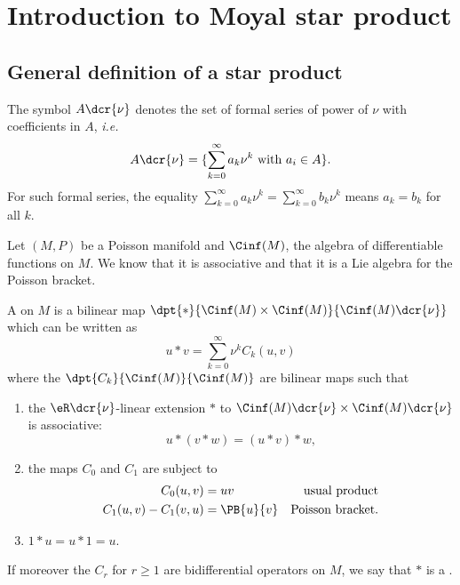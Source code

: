 \section{Introduction to Moyal star product}\label{app:Moyal}

\subsection{General definition of a star product}

The symbol $A\dcr{\nu}$ denotes the set of formal series of power of $\nu$ with coefficients in $A$, \textit{i.e.}
\[
A\dcr{\nu}=\{\sum_{k=0}^{\infty}a_k\nu^k\text{ with } a_i\in A\}.
\]
  For such formal series, the equality $\sum_{k=0}^{\infty}a_k\nu^k=\sum_{k=0}^{\infty}b_k\nu^k$ means $a_k=b_k$ for all $k$.

Let $(M,P)$ be a Poisson manifold and $\Cinf(M)$, the algebra of differentiable functions on $M$. We know that it is associative and that it is a Lie algebra for the Poisson bracket.


\begin{definition}
A  on $M$ is a bilinear map $\dpt{\ast}{\Cinf(M)\times\Cinf(M)}{\Cinf(M)\dcr{\nu}}$ which can be written as
\begin{equation}
       u\ast v=\sum_{k=0}^{\infty}\nu^kC_k(u,v)
\end{equation}
where the $\dpt{C_k}{\Cinf(M)}{\Cinf(M)}$ are bilinear maps such that
\renewcommand{\labelenumi}{(\roman{enumi})}
\begin{enumerate}
\item the $\eR\dcr{\nu}$-linear extension $\ast$ to $\Cinf(M)\dcr{\nu}\times\Cinf(M)\dcr{\nu}$ is associative:
\begin{equation}
                               u\ast(v\ast w)=(u\ast v)\ast w,
\end{equation}


\item the maps $C_0$ and $C_1$ are subject to
\begin{equation}
\begin{aligned}
  C_0(u,v)         &=uv       & \text{usual product}\\
  C_1(u,v)-C_1(v,u)&=\PB{u}{v}&\text{Poisson bracket}.
\end{aligned}
\end{equation}

\item $1\ast u=u\ast 1=u$.
\end{enumerate}
If moreover the $C_r$ for $r\ge 1$ are bidifferential operators on $M$, we say that $\ast$ is a .

\end{definition}

